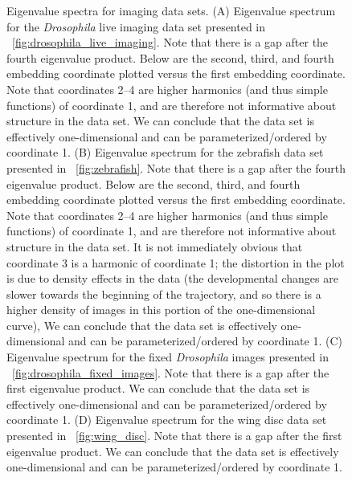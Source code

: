 \begin{figure}
\caption[Eigenvalue spectra for imaging data sets]{Eigenvalue spectra for imaging data sets. (A) Eigenvalue spectrum for the {\em Drosophila} live imaging data set presented in \fig~\ref{fig:drosophila_live_imaging}. Note that there is a gap after the fourth eigenvalue product. Below are the second, third, and fourth embedding coordinate plotted versus the first embedding coordinate. Note that coordinates 2--4 are higher harmonics (and thus simple functions) of coordinate 1, and are therefore not informative about structure in the data set.  We can conclude that the data set is effectively one-dimensional and can be parameterized/ordered by coordinate 1. (B) Eigenvalue spectrum for the zebrafish data set presented in \fig~\ref{fig:zebrafish}. Note that there is a gap after the fourth eigenvalue product. Below are the second, third, and fourth embedding coordinate plotted versus the first embedding coordinate. Note that coordinates 2--4 are higher harmonics (and thus simple functions) of coordinate 1, and are therefore not informative about structure in the data set.  It is not immediately obvious that coordinate 3 is a harmonic of coordinate 1; the distortion in the plot is due to density effects in the data (the developmental changes are slower towards the beginning of the trajectory, and so there is a higher density of images in this portion of the one-dimensional curve), We can conclude that the data set is effectively one-dimensional and can be parameterized/ordered by coordinate 1. (C) Eigenvalue spectrum for the fixed {\em Drosophila} images presented in \fig~\ref{fig:drosophila_fixed_images}. Note that there is a gap after the first eigenvalue product. We can conclude that the data set is effectively one-dimensional and can be parameterized/ordered by coordinate 1. (D) Eigenvalue spectrum for the wing disc data set presented in \fig~\ref{fig:wing_disc}. Note that there is a gap after the first eigenvalue product. We can conclude that the data set is effectively one-dimensional and can be parameterized/ordered by coordinate 1. }
\label{fig:eigenvalues_images}
\end{figure}


